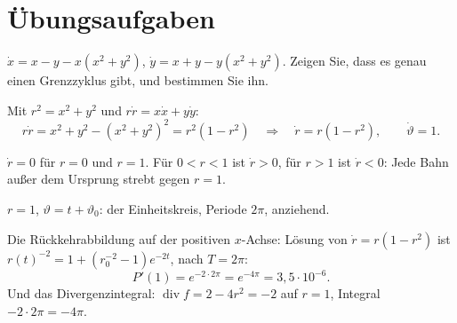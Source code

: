 \section{Übungsaufgaben}

\begin{aufgabe}
$\dot x = x - y - x(x^{2}+y^{2})$, $\dot y = x + y - y(x^{2}+y^{2})$. Zeigen Sie, dass es genau einen Grenzzyklus gibt, und bestimmen Sie ihn.

\loesung
{}
Mit $r^{2} = x^{2}+y^{2}$ und $r\dot r = x\dot x + y\dot y$:
\[ r\dot r = x^{2} + y^{2} - (x^{2}+y^{2})^{2} = r^{2}(1 - r^{2}) \quad\Longrightarrow\quad \dot r = r(1-r^{2}), \qquad \dot\vartheta = 1 . \]

$\dot r = 0$ für $r = 0$ und $r = 1$. Für $0 < r < 1$ ist $\dot r > 0$, für $r > 1$ ist $\dot r < 0$: Jede Bahn außer dem Ursprung strebt gegen $r = 1$.

$r = 1$, $\vartheta = t + \vartheta_0$: der Einheitskreis, Periode $2\pi$, anziehend.

Die Rückkehrabbildung auf der positiven $x$-Achse: Lösung von $\dot r = r(1-r^{2})$ ist $r(t)^{-2} = 1 + (r_0^{-2}-1)e^{-2t}$, nach $T = 2\pi$:
\[ P'(1) = e^{-2\cdot2\pi} = e^{-4\pi} = 3{,}5\cdot10^{-6} . \]
Und das Divergenzintegral: $\operatorname{div} f = 2 - 4r^{2} = -2$ auf $r=1$, Integral $-2\cdot2\pi = -4\pi$. \checkmark

\begin{center}
\begin{minipage}{0.88\textwidth}
\end{minipage}
\end{center}
\end{aufgabe}


